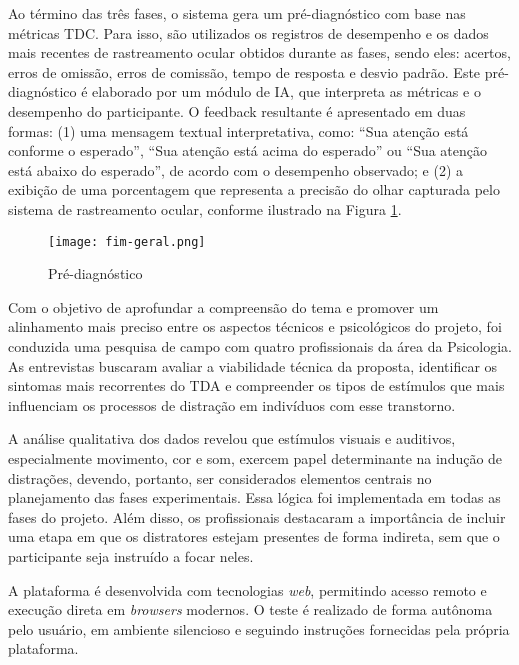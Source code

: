 Ao término das três fases, o sistema gera um pré-diagnóstico com base nas métricas TDC. Para isso, são utilizados os registros de desempenho e os dados mais recentes de rastreamento ocular obtidos durante as fases, sendo eles: acertos, erros de omissão, erros de comissão, tempo de resposta e desvio padrão. Este pré-diagnóstico é elaborado por um módulo de IA, que interpreta as métricas e o desempenho do participante. O feedback resultante é apresentado em duas formas: (1) uma mensagem textual interpretativa, como: “Sua atenção está conforme o esperado”, “Sua atenção está acima do esperado” ou “Sua atenção está abaixo do esperado”, de acordo com o desempenho observado; e (2) a exibição de uma porcentagem que representa a precisão do olhar capturada pelo sistema de rastreamento ocular, conforme ilustrado na Figura \ref{fig:fim-geral}.

\begin{figure}[H]
    \centering
    \caption{Pré-diagnóstico}%
    \label{fig:fim-geral}
    \texttt{[image: fim-geral.png]}%
\end{figure}

Com o objetivo de aprofundar a compreensão do tema e promover um alinhamento mais preciso entre os aspectos técnicos e psicológicos do projeto, foi conduzida uma pesquisa de campo com quatro profissionais da área da Psicologia. As entrevistas buscaram avaliar a viabilidade técnica da proposta, identificar os sintomas mais recorrentes do TDA e compreender os tipos de estímulos que mais influenciam os processos de distração em indivíduos com esse transtorno.

A análise qualitativa dos dados revelou que estímulos visuais e auditivos, especialmente movimento, cor e som, exercem papel determinante na indução de distrações, devendo, portanto, ser considerados elementos centrais no planejamento das fases experimentais. Essa lógica foi implementada em todas as fases do projeto.
Além disso, os profissionais destacaram a importância de incluir uma etapa em que os distratores estejam presentes de forma indireta, sem que o participante seja instruído a focar neles.

A plataforma é desenvolvida com tecnologias \textit{web}, permitindo acesso remoto e execução
direta em \textit{browsers} modernos. O teste é realizado de forma autônoma pelo usuário, em ambiente silencioso e seguindo instruções fornecidas pela própria plataforma.

